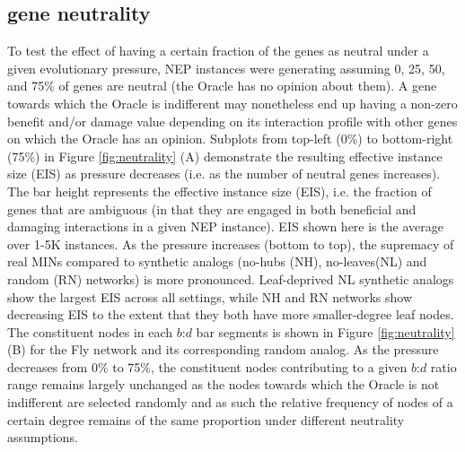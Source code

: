 \documentclass[12pt]{article}
\begin{document}
\subsection{gene neutrality}\label{neutrality}
To test the effect of having a certain fraction of the genes as neutral under a given evolutionary pressure, NEP instances were generating assuming 0, 25, 50, and 75\% of genes are neutral (the Oracle has no opinion about them). A gene towards which the Oracle is indifferent may nonetheless end up having a non-zero benefit and/or damage value depending on its interaction profile with other genes on which the Oracle has an opinion. Subplots from top-left (0\%) to bottom-right (75\%) in  Figure \ref{fig:neutrality} (A) demonstrate the resulting effective instance size (EIS) as pressure decreases (i.e. as the number of neutral genes increases). The bar height represents the effective instance size (EIS), i.e. the fraction of genes that are ambiguous (in that they are engaged in both beneficial and damaging interactions in a given NEP instance). EIS shown here is the average over 1-5K instances. As the pressure increases (bottom to top), the supremacy of real MINs compared to synthetic analogs (no-hubs (NH), no-leaves(NL) and random (RN) networks) is more pronounced. Leaf-deprived NL synthetic analogs show the largest EIS across all settings, while NH and RN networks show decreasing EIS to the extent that they both have more smaller-degree leaf nodes. The constituent nodes in each $b$:$d$ bar segments is shown in Figure  \ref{fig:neutrality} (B) for the  Fly network and its corresponding random analog. As the pressure decreases from 0\% to 75\%, the constituent nodes contributing to a given $b$:$d$ ratio range remains largely unchanged as the nodes towards which the Oracle is not indifferent are selected randomly and as such the relative frequency of nodes of a certain degree remains of the same proportion under different neutrality assumptions.
\end{document}

